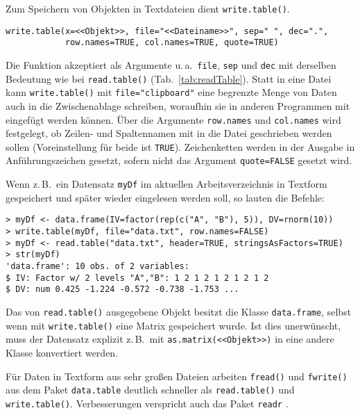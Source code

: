 Zum Speichern von Objekten in Textdateien dient \lstinline!write.table()!.
\begin{lstlisting}
write.table(x=<<Objekt>>, file="<<Dateiname>>", sep=" ", dec=".",
            row.names=TRUE, col.names=TRUE, quote=TRUE)
\end{lstlisting}

Die Funktion akzeptiert als Argumente u.\,a.\ \lstinline!file!, \lstinline!sep! und \lstinline!dec! mit derselben Bedeutung wie bei \lstinline!read.table()! (Tab.\ \ref{tab:readTable}). Statt in eine Datei kann \lstinline!write.table()! mit \lstinline!file="clipboard"! eine begrenzte Menge von Daten auch in die Zwischenablage schreiben, woraufhin sie in anderen Programmen mit  eingefügt werden können. Über die Argumente \lstinline!row.names! und \lstinline!col.names! wird festgelegt, ob Zeilen- und Spaltennamen mit in die Datei geschrieben werden sollen (Voreinstellung für beide ist \lstinline!TRUE!). Zeichenketten werden in der Ausgabe in Anführungszeichen gesetzt, sofern nicht das Argument \lstinline!quote=FALSE! gesetzt wird.

Wenn z.\,B.\ ein Datensatz \lstinline!myDf! im aktuellen Arbeitsverzeichnis in Textform gespeichert und später wieder eingelesen werden soll, so lauten die Befehle:
\begin{lstlisting}
> myDf <- data.frame(IV=factor(rep(c("A", "B"), 5)), DV=rnorm(10))
> write.table(myDf, file="data.txt", row.names=FALSE)
> myDf <- read.table("data.txt", header=TRUE, stringsAsFactors=TRUE)
> str(myDf)
'data.frame': 10 obs. of 2 variables:
$ IV: Factor w/ 2 levels "A","B": 1 2 1 2 1 2 1 2 1 2
$ DV: num 0.425 -1.224 -0.572 -0.738 -1.753 ...
\end{lstlisting}

Das von \lstinline!read.table()! ausgegebene Objekt besitzt die Klasse \lstinline!data.frame!, selbst wenn mit \lstinline!write.table()! eine Matrix gespeichert wurde. Ist dies unerwünscht, muss der Datensatz explizit z.\,B.\ mit \lstinline!as.matrix(<<Objekt>>)! in eine andere Klasse konvertiert werden.

Für Daten in Textform aus sehr großen Dateien arbeiten \lstinline!fread()! und \lstinline!fwrite()! aus dem Paket \lstinline!data.table! \cite{Dowle2014} deutlich schneller als \lstinline!read.table()! und \lstinline!write.table()!. Verbesserungen verspricht auch das Paket \lstinline!readr! \cite{Wickham2015c}.

